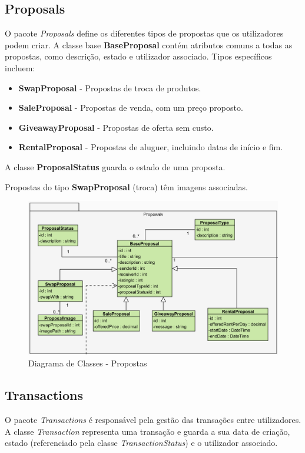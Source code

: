 \documentclass[a4paper, 12pt]{article} %
\begin{document}
\subsection{Proposals}
O pacote \textit{Proposals} define os diferentes tipos de propostas que os utilizadores podem criar. A classe base \textbf{BaseProposal} contém atributos comuns a todas as propostas, como descrição, estado e utilizador associado. Tipos específicos incluem:
\begin{itemize}
	\item \textbf{SwapProposal} - Propostas de troca de produtos.
	\item \textbf{SaleProposal} - Propostas de venda, com um preço proposto.
	\item \textbf{GiveawayProposal} - Propostas de oferta sem custo.
	\item \textbf{RentalProposal} - Propostas de aluguer, incluindo datas de início e fim.
\end{itemize}
A classe \textbf{ProposalStatus} guarda o estado de uma proposta.

Propostas do tipo \textbf{SwapProposal} (troca) têm imagens associadas.

\begin{figure}[ht]
	\centering
	\includegraphics[width=\textwidth]{../images/class-diagram-proposals.png}
	\caption{Diagrama de Classes - Propostas}
	\label{fig:class_diagram_proposals}
\end{figure}

\newpage
\subsection{Transactions}
O pacote \textit{Transactions} é responsável pela gestão das transações entre utilizadores. A classe \textit{Transaction} representa uma transação e guarda a sua data de criação, estado (referenciado pela classe \textit{TransactionStatus}) e o utilizador associado.
\end{document}
